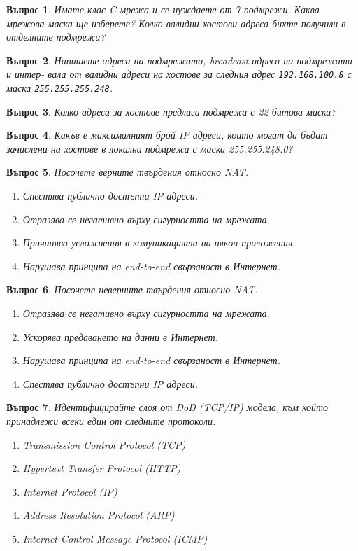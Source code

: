 \documentclass[11pt]{scrartcl}
\newtheorem{q}{Въпрос}
\newenvironment{defractors}{
\begin{enumerate}
  \setlength{\itemsep}{1pt}
  \setlength{\parskip}{0pt}
  \setlength{\parsep}{0pt}
}{\end{enumerate}}
\begin{document}
\begin{q}
  Имате клас C мрежа и се нуждаете от 7 подмрежи. Каква мрежова маска ще
  изберете? Колко валидни хостови адреса бихте получили в отделните подмрежи?
\end{q}

\begin{q}
  Напишете адреса на подмрежата, broadcast адреса на подмрежата и интер- вала от
  валидни адреси на хостове за следния адрес \texttt{192.168.100.8} с маска
  \texttt{255.255.255.248}.
\end{q}

\begin{q}
  Колко адреса за хостове предлага подмрежа с 22-битова маска?
\end{q}

\begin{q}
  Какъв е максималният брой IP адреси, които могат да бъдат зачислени на хостове
  в локална подмрежа с маска 255.255.248.0?
\end{q}

\begin{q}
  Посочете верните твърдения относно NAT.

  \begin{defractors}
  \item Спестява публично достъпни IP адреси.
  \item Отразява се негативно върху сигурността на мрежата.
  \item Причинява усложнения в комуникацията на някои приложения.
  \item Нарушава принципа на end-to-end свързаност в Интернет.
  \end{defractors}
\end{q}

\begin{q}
  Посочете неверните твърдения относно NAT.
  \begin{defractors}
  \item Отразява се негативно върху сигурността на мрежата.
  \item Ускорява предаването на данни в Интернет.
  \item Нарушава принципа на end-to-end свързаност в Интернет.
  \item Спестява публично достъпни IP адреси.
  \end{defractors}
\end{q}

\begin{q}
  Идентифицирайте слоя от DoD (TCP/IP) модела, към който принадлежи всеки един
  от следните протоколи:

  \begin{defractors}
    \item Transmission Control Protocol (TCP)
    \item Hypertext Transfer Protocol (HTTP)
    \item Internet Protocol (IP)
    \item Address Resolution Protocol (ARP)
    \item Internet Control Message Protocol (ICMP)
  \end{defractors}
\end{q}
\end{document}
